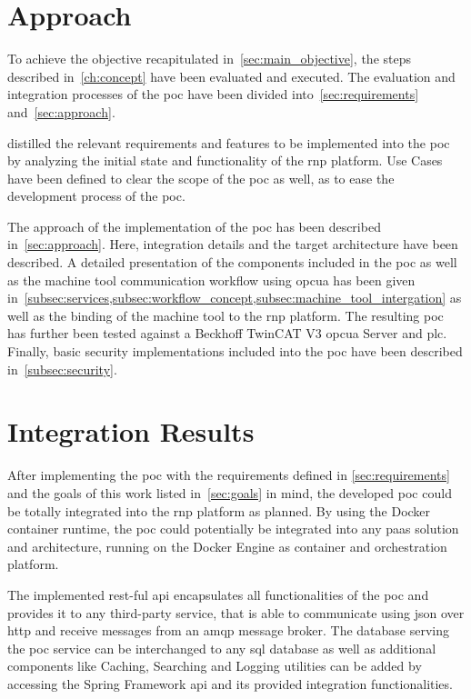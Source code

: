 \documentclass[
a4paper,
twoside,
headsepline,
cleardoublepage=empty,
parskip=half,
draft=false
]{scrbook}
\begin{document}
		\section{Approach}\label{sec:discussion_approach}
		
			To achieve the objective recapitulated in~\cref{sec:main_objective}, the steps described in~\cref{ch:concept} have been evaluated and executed. The evaluation and integration processes of the \gls{poc} have been divided into~\cref{sec:requirements} and~\cref{sec:approach}.
			
			 distilled the relevant requirements and features to be implemented into the \gls{poc} by analyzing the initial state and functionality of the \gls{rnp} platform. Use Cases have been defined to clear the scope of the \gls{poc} as well, as to ease the development process of the \gls{poc}.
			
			The approach of the implementation of the \gls{poc} has been described in~\cref{sec:approach}. Here, integration details and the target architecture have been described. A detailed presentation of the components included in the \gls{poc} as well as the machine tool communication workflow using \gls{opcua} has been given in~\cref{subsec:services,subsec:workflow_concept,subsec:machine_tool_intergation} as well as the binding of the machine tool to the \gls{rnp} platform. 
			The resulting \gls{poc} has further been tested against a Beckhoff TwinCAT V3 \gls{opcua} Server and \gls{plc}.
			Finally, basic security implementations included into the \gls{poc} have been described in~\cref{subsec:security}.
			
		\section{Integration Results}\label{sec:integration_results}

			After implementing the \gls{poc} with the requirements defined in \cref{sec:requirements} and the goals of this work listed in~\cref{sec:goals} in mind, the developed \gls{poc} could be totally integrated into the \gls{rnp} platform as planned. By using the Docker container runtime, the \gls{poc} could potentially be integrated into any \gls{paas} solution and architecture, running on the Docker Engine as container and orchestration platform.

			The implemented \gls{rest}-ful \gls{api} encapsulates all functionalities of the \gls{poc} and provides it to any third-party service, that is able to communicate using \gls{json} over \gls{http} and receive messages from an \gls{amqp} message broker. The database serving the \gls{poc} service can be interchanged to any \gls{sql} database as well as additional components like Caching, Searching and Logging utilities can be added by accessing the Spring Framework \gls{api} and its provided integration functionalities.
\end{document}
